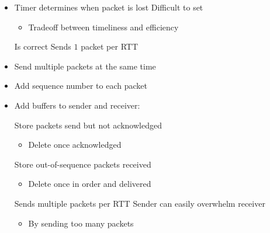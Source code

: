 \begin{itemize}
\begin{itemize}
\begin{verbatim}
\end{verbatim}
            \item Timer determines when packet is lost
             Difficult to set
                \begin{itemize}
                     Unnecessary retransmissions
                     Slow transmission
                        \begin{itemize}
                            \item Long wait for missing packets
                        \end{itemize}
                    \item Tradeoff between timeliness and efficiency
                \end{itemize}
            \ipro Is correct
            \icon Sends $1$ packet per RTT
        \end{itemize}
        \begin{itemize}
            \item Send multiple packets at the same time
            \item Add sequence number to each packet
            \item Add buffers to sender and receiver:
                \begin{itemize}
                     Store packets send but not acknowledged
                        \begin{itemize}
                            \item Delete once acknowledged
                        \end{itemize}
                     Store out-of-sequence packets received
                        \begin{itemize}
                            \item Delete once in order and delivered
                        \end{itemize}
                \end{itemize}
            \ipro Sends multiple packets per RTT
            \icon Sender can easily overwhelm receiver
                \begin{itemize}
                    \item By sending too many packets
                \end{itemize}
        \end{itemize}
        \begin{itemize}

\end{itemize}
\end{itemize}
